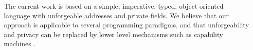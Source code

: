 

 
  The current work is based on a simple, imperative, typed, object oriented
language with unforgeable addresses and private fields. We believe
 that our approach is applicable to several programming paradigms, and 
 that   unforgeability and privacy
 can be replaced 
 by lower level mechanisms such as capability machines \cite{vanproving,davis2019cheriabi}.
 


% 
% 
%
% 
% 

